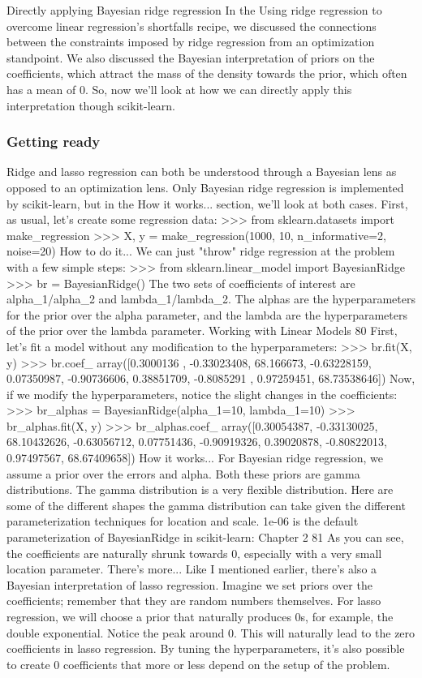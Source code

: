 Directly applying Bayesian ridge regression
In the Using ridge regression to overcome linear regression's shortfalls recipe, we discussed
the connections between the constraints imposed by ridge regression from an optimization
standpoint. We also discussed the Bayesian interpretation of priors on the coefficients, which
attract the mass of the density towards the prior, which often has a mean of 0.
So, now we'll look at how we can directly apply this interpretation though scikit-learn.
\subsubsection{Getting ready}
Ridge and lasso regression can both be understood through a Bayesian lens as opposed to
an optimization lens. Only Bayesian ridge regression is implemented by scikit-learn, but in the
How it works... section, we'll look at both cases.
First, as usual, let's create some regression data:
>>> from sklearn.datasets import make_regression
>>> X, y = make_regression(1000, 10, n_informative=2, noise=20)
How to do it...
We can just "throw" ridge regression at the problem with a few simple steps:
>>> from sklearn.linear_model import BayesianRidge
>>> br = BayesianRidge()
The two sets of coefficients of interest are alpha_1/alpha_2 and lambda_1/lambda_2.
The alphas are the hyperparameters for the prior over the alpha parameter, and the lambda
are the hyperparameters of the prior over the lambda parameter.
Working with Linear Models
80
First, let's fit a model without any modification to the hyperparameters:
>>> br.fit(X, y)
>>> br.coef_
array([0.3000136 , -0.33023408, 68.166673, -0.63228159, 0.07350987,
-0.90736606, 0.38851709, -0.8085291 , 0.97259451, 68.73538646])
Now, if we modify the hyperparameters, notice the slight changes in the coefficients:
>>> br_alphas = BayesianRidge(alpha_1=10, lambda_1=10)
>>> br_alphas.fit(X, y)
>>> br_alphas.coef_
array([0.30054387, -0.33130025, 68.10432626, -0.63056712,
0.07751436, -0.90919326, 0.39020878, -0.80822013,
0.97497567, 68.67409658])
How it works...
For Bayesian ridge regression, we assume a prior over the errors and alpha. Both these priors
are gamma distributions.
The gamma distribution is a very flexible distribution. Here are some of the different shapes
the gamma distribution can take given the different parameterization techniques for location
and scale. 1e-06 is the default parameterization of BayesianRidge in scikit-learn:
Chapter 2
81
As you can see, the coefficients are naturally shrunk towards 0, especially with a very small
location parameter.
There's more...
Like I mentioned earlier, there's also a Bayesian interpretation of lasso regression. Imagine
we set priors over the coefficients; remember that they are random numbers themselves.
For lasso regression, we will choose a prior that naturally produces 0s, for example, the
double exponential.
Notice the peak around 0. This will naturally lead to the zero coefficients in lasso regression.
By tuning the hyperparameters, it's also possible to create 0 coefficients that more or less
depend on the setup of the problem.
